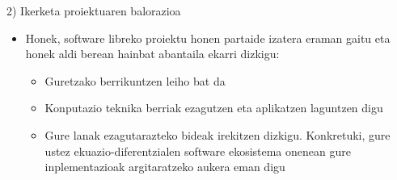 \documentclass[
 10pt,%
 compress,%
 t,       %
 xcolor=svgnames
]{beamer}
\theoremstyle{definition} \newtheorem{definicion}{Definicion}[section]
\theoremstyle{propiedades} \newtheorem{propiedades}{Propiedades}[section]
\begin{document}
\begin{frame}{2) Ikerketa proiektuaren balorazioa}
{\begin{itemize}
\begin{itemize}
	\medskip
	\item Konputazio zientifikorako goi-mailako lengoaia delako %
	
	
	\medskip
	\item Azkarra da (C lengoaia bezain eraginkorra izan daiteke) 
	
	\medskip
	\item Notebook dokumentu dinamikoak onartzen ditu

\end{itemize}

    \medskip
\item  Honek, software libreko proiektu honen partaide izatera eraman gaitu eta honek aldi berean hainbat  abantaila ekarri dizkigu:

\begin{itemize}
	
	\item Guretzako berrikuntzen leiho bat da
	
	\medskip
	\item Konputazio teknika berriak ezagutzen eta aplikatzen laguntzen digu
	
	\medskip
	\item Gure lanak ezagutarazteko bideak irekitzen dizkigu. Konkretuki, gure ustez ekuazio-diferentzialen software ekosistema onenean gure inplementazioak argitaratzeko aukera eman digu
	
\end{itemize}

\end{itemize}

}

\end{frame}




\end{document}
